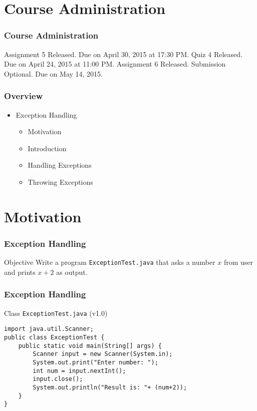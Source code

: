 \documentclass[10pt, compress]{beamer}
\begin{document}
\prepareCover

\section{Course Administration}

\begin{frame}[fragile]
\frametitle{Course Administration}
Assignment 5 Released. Due on April 30, 2015 at 17:30 PM.
Quiz 4 Released. Due on April 24, 2015 at 11:00 PM.
Assignment 6 Released. Submission Optional. Due on May 14, 2015.
\end{frame}

\begin{frame}[fragile]
	\frametitle{Overview}
	\begin{itemize}
		\item[] Exception Handling
		\begin{itemize}
			\item[] Motivation
			\item[] Introduction
			\item[] Handling Exceptions
			\item[] Throwing Exceptions
		\end{itemize}
	\end{itemize}
\end{frame}


\section{Motivation}

\begin{frame}[fragile]
	\frametitle{Exception Handling}
	\begin{block}{Objective}
		Write a program \texttt{ExceptionTest.java} that asks a number $x$ from user and prints $x+2$ as output.
	\end{block}
\end{frame}

\begin{frame}[fragile]
	\frametitle{Exception Handling}
	\begin{block}{Class \texttt{ExceptionTest.java} (v1.0)}
		\begin{verbatim}
import java.util.Scanner;
public class ExceptionTest {
	public static void main(String[] args) {
		Scanner input = new Scanner(System.in);
		System.out.print("Enter number: ");
		int num = input.nextInt();
		input.close();
		System.out.println("Result is: "+ (num+2));
	}
}
		\end{verbatim}
	\end{block}
\end{frame}
\end{document}
